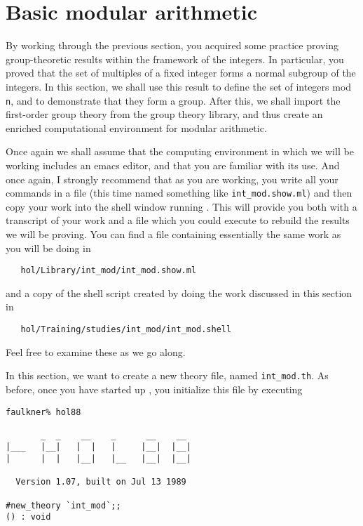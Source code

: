 \section{Basic modular arithmetic}

By working through the previous section, you acquired some practice
proving group-theoretic results within the framework of the integers.
In particular, you proved that the set of multiples of a fixed integer
forms a normal subgroup of the integers.  In this section, we shall
use this result to define the set of integers mod {\small\tt n}, and to
demonstrate that they form a group.  After this, we shall import the
first-order group theory from the group theory library, and thus
create an enriched computational environment for modular arithmetic.

Once again we shall assume that the computing environment in which we
will be working includes an emacs editor, and that you are familiar
with its use.  And once again, I strongly recommend that as you are
working, you write all your commands in a file (this time named
something like {\small\verb+int_mod.show.ml+}) and then copy your work
into the shell window running \HOL.  This will provide you both with a
transcript of your work and a file which you could execute to rebuild
the results we will be proving.  You can find a file containing
essentially the same work as you will be doing in
\begin{verbatim}
   hol/Library/int_mod/int_mod.show.ml
\end{verbatim}
and a copy of the shell script created by doing the work discussed in
this section in
\begin{verbatim}
   hol/Training/studies/int_mod/int_mod.shell
\end{verbatim}
Feel free to examine these as we go along.

In this section, we want to create a new theory file, named
{\small\verb+int_mod.th+}.  As before, once you have started up \HOL,
you initialize this file by executing
\begin{session}
\begin{verbatim}
faulkner% hol88

       _  _    __    _      __    __
|___   |__|   |  |   |     |__|  |__|
|      |  |   |__|   |__   |__|  |__|

  Version 1.07, built on Jul 13 1989

#new_theory `int_mod`;;
() : void
\end{verbatim}
\end{session}


